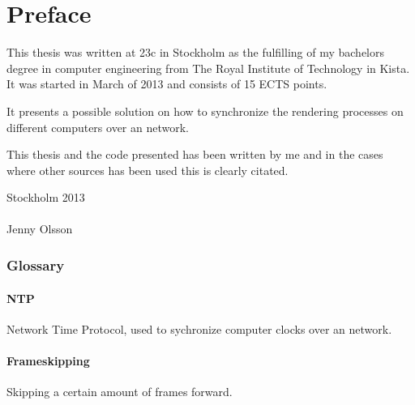 \chapter{Preface}

This thesis was written at 23c in Stockholm as the fulfilling of my bachelors degree in computer engineering from The Royal Institute of Technology in Kista. It was started in March of 2013 and consists of 15 ECTS points. 

It presents a possible solution on how to synchronize the rendering processes on different computers over an network. 

This thesis and the code presented has been written by me and in the cases where other sources has been used this is clearly citated. 


\vspace{20mm}
\mbox{}\hfill
\begin{minipage}[t]{80mm}
  Stockholm 2013\\
  \vspace{1cm}\\
  Jenny Olsson
\end{minipage}

\subsection*{Glossary}

\subsubsection*{NTP}
Network Time Protocol, used to sychronize computer clocks over an network. 

\subsubsection*{Frameskipping}
Skipping a certain amount of frames forward.

